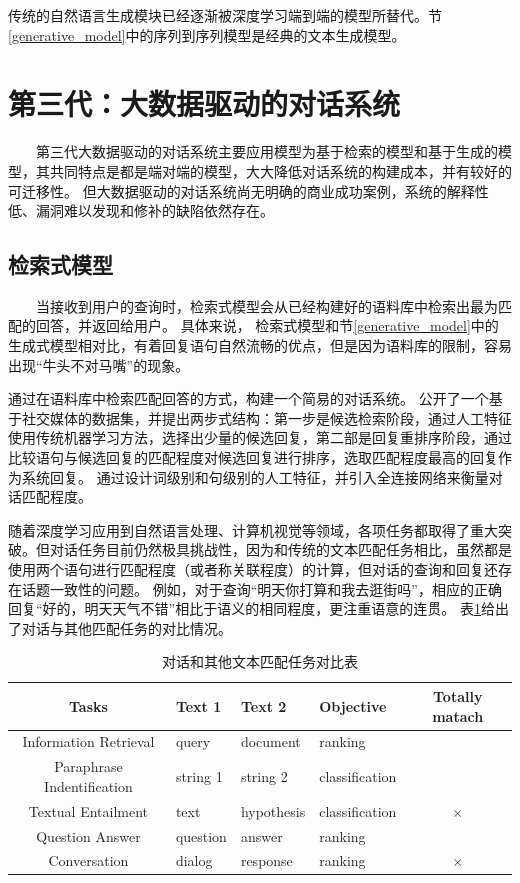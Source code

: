 \documentclass{clv3}
\begin{document}
传统的自然语言生成模块已经逐渐被深度学习端到端的模型所替代。节\ref{generative_model}中的序列到序列模型是经典的文本生成模型。

\section{第三代：大数据驱动的对话系统}
$\qquad$第三代大数据驱动的对话系统主要应用模型为基于检索的模型和基于生成的模型，其共同特点是都是端对端的模型，大大降低对话系统的构建成本，并有较好的可迁移性。
但大数据驱动的对话系统尚无明确的商业成功案例，系统的解释性低、漏洞难以发现和修补的缺陷依然存在。

\subsection{检索式模型}
$\qquad$当接收到用户的查询时，检索式模型会从已经构建好的语料库中检索出最为匹配的回答，并返回给用户。
具体来说，
检索式模型和节\ref{generative_model}中的生成式模型相对比，有着回复语句自然流畅的优点，但是因为语料库的限制，容易出现“牛头不对马嘴”的现象。

\cite{isbell2006cobot}通过在语料库中检索匹配回答的方式，构建一个简易的对话系统。
\cite{wang2013a}公开了一个基于社交媒体的数据集，并提出两步式结构：第一步是候选检索阶段，通过人工特征使用传统机器学习方法，选择出少量的候选回复，第二部是回复重排序阶段，通过比较语句与候选回复的匹配程度对候选回复进行排序，选取匹配程度最高的回复作为系统回复。
\cite{ji2014an}通过设计词级别和句级别的人工特征，并引入全连接网络来衡量对话匹配程度。

随着深度学习应用到自然语言处理、计算机视觉等领域，各项任务都取得了重大突破\cite{goodfellow2016deep}。但对话任务目前仍然极具挑战性，因为和传统的文本匹配任务相比，虽然都是使用两个语句进行匹配程度（或者称关联程度）的计算，但对话的查询和回复还存在话题一致性的问题。
例如，对于查询“明天你打算和我去逛街吗”，相应的正确回复“好的，明天天气不错”相比于语义的相同程度，更注重语意的连贯。
表\ref{表1}给出了对话与其他匹配任务的对比情况。

\begin{table}
	\centering
	\caption{对话和其他文本匹配任务对比表}
	\label{表1}
	\begin{tabular}{c|lllc}
		\hline
		Tasks & Text 1 & Text 2	& Objective & Totally matach\\
		\hline
		Information Retrieval & query & document & ranking & \checkmark\\
		Paraphrase Indentification & string 1	& string 2	& classification & \checkmark\\
		Textual Entailment & text & hypothesis & classification & $\times$\\
		Question Answer	& question & answer & ranking & \checkmark\\
		Conversation & dialog & response & ranking & $\times$\\
		\hline
	\end{tabular}
\end{table}
\end{document}
